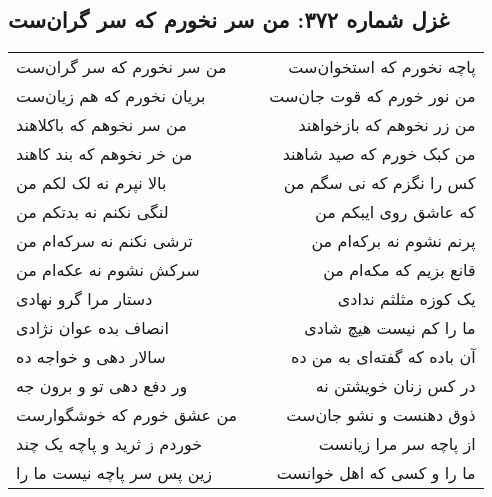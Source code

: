 \begin{center}
\section*{غزل شماره ۳۷۲: من سر نخورم که سر گران‌ست}
\label{sec:0372}
\begin{longtable}{l p{0.5cm} r}
من سر نخورم که سر گران‌ست
&&
پاچه نخورم که استخوان‌ست
\\
بریان نخورم که هم زیان‌ست
&&
من نور خورم که قوت جان‌ست
\\
من سر نخوهم که باکلاهند
&&
من زر نخوهم که بازخواهند
\\
من خر نخوهم که بند کاهند
&&
من کبک خورم که صید شاهند
\\
بالا نپرم نه لک لکم من
&&
کس را نگزم که نی سگم من
\\
لنگی نکنم نه بدتکم من
&&
که عاشق روی ایبکم من
\\
ترشی نکنم نه سرکه‌ام من
&&
پرنم نشوم نه برکه‌ام من
\\
سرکش نشوم نه عکه‌ام من
&&
قانع بزیم که مکه‌ام من
\\
دستار مرا گرو نهادی
&&
یک کوزه مثلثم ندادی
\\
انصاف بده عوان نژادی
&&
ما را کم نیست هیچ شادی
\\
سالار دهی و خواجه ده
&&
آن باده که گفته‌ای به من ده
\\
ور دفع دهی تو و برون جه
&&
در کس زنان خویشتن نه
\\
من عشق خورم که خوشگوارست
&&
ذوق دهنست و نشو جان‌ست
\\
خوردم ز ثرید و پاچه یک چند
&&
از پاچه سر مرا زیانست
\\
زین پس سر پاچه نیست ما را
&&
ما را و کسی که اهل خوانست
\\
\end{longtable}
\end{center}
